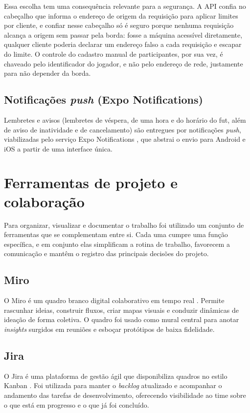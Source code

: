         Essa escolha tem uma consequência relevante para a segurança. A API confia no cabeçalho que informa o endereço de origem da requisição para aplicar limites por cliente, e confiar nesse cabeçalho só é seguro porque nenhuma requisição alcança a origem sem passar pela borda: fosse a máquina acessível diretamente, qualquer cliente poderia declarar um endereço falso a cada requisição e escapar do limite. O controle do cadastro manual de participantes, por sua vez, é chaveado pelo identificador do jogador, e não pelo endereço de rede, justamente para não depender da borda.

        \subsection{Notificações \textit{push} (Expo Notifications)}
        Lembretes e avisos (lembretes de véspera, de uma hora e do horário do fut, além de aviso de inatividade e de cancelamento) são entregues por notificações \textit{push}, viabilizadas pelo serviço Expo Notifications \cite{expo_notifications_docs}, que abstrai o envio para Android e iOS a partir de uma interface única.

    \section{Ferramentas de projeto e colaboração}

        Para organizar, visualizar e documentar o trabalho foi utilizado um conjunto de ferramentas que se complementam entre si. Cada uma cumpre uma função específica, e em conjunto elas simplificam a rotina de trabalho, favorecem a comunicação e mantêm o registro das principais decisões do projeto.

        \subsection{Miro}
            O Miro é um quadro branco digital colaborativo em tempo real \cite{miro_whiteboard}. Permite rascunhar ideias, construir fluxos, criar mapas visuais e conduzir dinâmicas de ideação de forma coletiva. O quadro foi usado como mural central para anotar \textit{insights} surgidos em reuniões e esboçar protótipos de baixa fidelidade.

        \subsection{Jira}
            O Jira é uma plataforma de gestão ágil que disponibiliza quadros no estilo Kanban \cite{jira_intro}. Foi utilizada para manter o \textit{backlog} atualizado e acompanhar o andamento das tarefas de desenvolvimento, oferecendo visibilidade ao time sobre o que está em progresso e o que já foi concluído.

